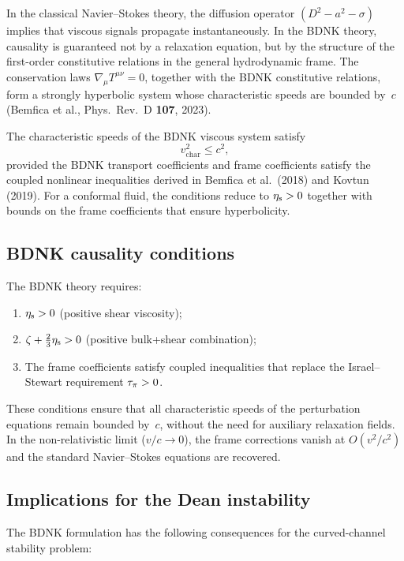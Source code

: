 In the classical Navier--Stokes theory, the diffusion operator
$(D^2 - a^2 - \sigma)$ implies that viscous signals propagate
instantaneously.  In the BDNK theory, causality is guaranteed
not by a relaxation equation, but by the structure of the first-order
constitutive relations in the general hydrodynamic frame.  The
conservation laws $\nabla_\mu T^{\mu\nu} = 0$, together with the BDNK
constitutive relations, form a strongly hyperbolic system whose
characteristic speeds are bounded by~$c$
(Bemfica et al., Phys.\ Rev.\ D \textbf{107}, 2023).

The characteristic speeds of the BDNK viscous system satisfy
\begin{equation}
\label{eq:rel-8-BDNK-char}
v_{\mathrm{char}}^2 \leqslant c^2,
\end{equation}
provided the BDNK transport coefficients and frame coefficients satisfy
the coupled nonlinear inequalities derived in
Bemfica et al.\ (2018) and Kovtun (2019).  For a conformal fluid, the
conditions reduce to $\eta_{\mathrm{s}} > 0$ together with bounds on the frame
coefficients that ensure hyperbolicity.

\subsection{BDNK causality conditions}
\label{sec:rel-76-caus-b}

The BDNK theory requires:
\begin{enumerate}
\item $\eta_{\mathrm{s}} > 0$ (positive shear viscosity);
\item $\zeta + \tfrac{2}{3}\eta_{\mathrm{s}} > 0$ (positive bulk+shear
  combination);
\item The frame coefficients satisfy coupled inequalities that replace
  the Israel--Stewart requirement $\tau_{\pi} > 0$.
\end{enumerate}
These conditions ensure that all characteristic speeds of the
perturbation equations remain bounded by~$c$, without the need for
auxiliary relaxation fields.  In the non-relativistic limit
($v/c \to 0$), the frame corrections vanish at $O(v^2/c^2)$ and the
standard Navier--Stokes equations are recovered.

\subsection{Implications for the Dean instability}
\label{sec:rel-76-caus-c}

The BDNK formulation has the following consequences for the
curved-channel stability problem:

